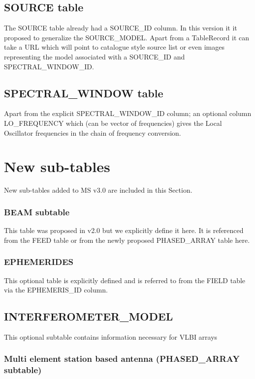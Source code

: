 \documentclass{article}
\begin{document}
\subsection{SOURCE table}

The SOURCE table already had a SOURCE\_ID column.  In this version it
it proposed to generalize the SOURCE\_MODEL. Apart from a TableRecord
it can take a URL which will point to catalogue style source list or
even images representing the model associated with a SOURCE\_ID and
SPECTRAL\_WINDOW\_ID.


\subsection{SPECTRAL\_WINDOW table}

Apart from the explicit SPECTRAL\_WINDOW\_ID column; an optional column
LO\_FREQUENCY which (can be vector of frequencies) gives the Local
Oscillator frequencies in the chain of frequency conversion.


\section{New sub-tables}

New sub-tables added to MS v3.0 are included in this Section.

\subsubsection{BEAM subtable}
This table was proposed in v2.0 but we explicitly define it here. It is referenced from the FEED table or from the newly proposed PHASED\_ARRAY table here.

\subsubsection{EPHEMERIDES}
This optional table is explicitly defined and is referred to from the FIELD table via the EPHEMERIS\_ID column.

\subsection{INTERFEROMETER\_MODEL}
This optional subtable contains information necessary for VLBI arrays

\subsubsection{Multi element station based antenna (PHASED\_ARRAY subtable)}
\end{document}
